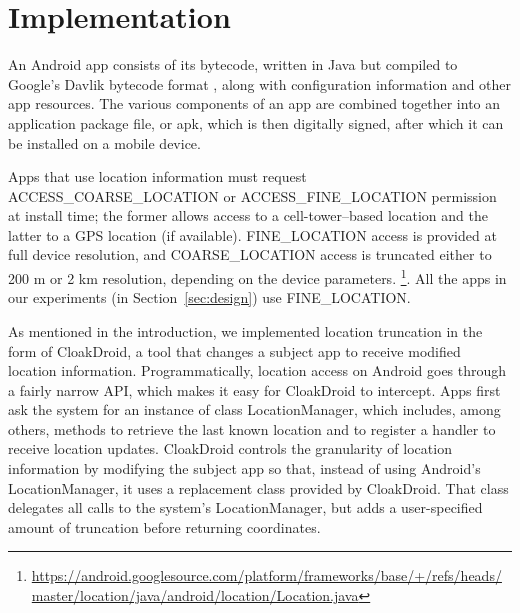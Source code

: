 \documentclass[10pt, conference, compsocconf]{IEEEtran}
\newcommand{\fuzzer}{CloakDroid\xspace}
\newcommand{\code}[1]{\textsf{#1}}
\begin{document}
\section{Implementation}
\label{sec:impl}

An Android app consists of its bytecode, written in Java but
compiled to Google's Davlik bytecode format \cite{dalvik-bytecode}, along with
configuration information and other app resources. The various
components of an app are combined together into an application package
file, or apk, which is then digitally signed, after which it can be
installed on a mobile device.

Apps that use
location information must request \code{ACCESS\_COARSE\_LOCATION}
or \code{ACCESS\_\-FINE\_\-LOCATION} permission at install time; the
former allows access to a cell-tower--based location and the latter
to a GPS location (if available). \code{FINE\_LOCATION} access is
provided at full device resolution, and \code{COARSE\_LOCATION} access is
truncated either to 200 m or 2 km resolution, depending on the device
parameters.
\footnote{\url{https://android.googlesource.com/platform/frameworks/base/+/refs/heads/master/location/java/android/location/Location.java}}.
All the apps in our experiments (in Section~\ref{sec:design}) use \code{FINE\_LOCATION}.

As mentioned in the introduction, we implemented location truncation
in the form of \fuzzer{}, a tool that changes a subject app to
receive modified location information.
Programmatically, location access on Android goes through a fairly narrow API,
which makes it easy for \fuzzer{} to intercept. Apps first ask the
system for an instance of class \code{LocationManager}, which
includes, among others, methods to retrieve the last known location
and to register a handler to receive location updates.
\fuzzer{} controls the granularity of
location information by modifying the subject app so that, instead of
using Android's \code{LocationManager}, it uses a replacement class
provided by \fuzzer{}. That class delegates all calls to the system's
\code{LocationManager}, but adds a user-specified amount of truncation
before returning coordinates.
\end{document}

